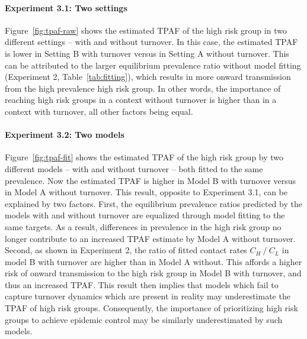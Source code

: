 \paragraph{Experiment 3.1: Two settings}
\label{p:res-tpaf-raw}
Figure~\ref{fig:tpaf-raw} shows the estimated TPAF of the high risk group
in two different settings -- with and without turnover.
In this case, the estimated TPAF is lower
in Setting B with turnover versus
in Setting A without turnover.
This can be attributed to
the larger equilibrium prevalence ratio without model fitting
(Experiment 2, Table~\ref{tab:fitting}),
which results in more onward transmission from the high prevalence high risk group.
In other words, the importance of reaching high risk groups
in a context without turnover is higher than in a context with turnover,
all other factors being equal.
\paragraph{Experiment 3.2: Two models}
\label{p:res-tpaf-fit}
Figure~\ref{fig:tpaf-fit} shows the estimated TPAF of the high risk group
by two different models -- with and without turnover --
both fitted to the same prevalence.
Now the estimated TPAF is higher
in Model B with turnover versus
in Model A without turnover.
This result, opposite to Experiment 3.1, can be explained by two factors.
First, the equilibrium prevalence ratios predicted by the models with and without turnover
are equalized through model fitting to the same targets.
As a result, differences in prevalence in the high risk group
no longer contribute to an increased TPAF estimate by Model A without turnover.
Second, as shown in Experiment 2, 
the ratio of fitted contact rates $C_H~/~C_L$ in model B with turnover
are higher than in Model A without.
This affords a higher risk of onward transmission to the high risk group
in Model B with turnover, and thus an increased TPAF.
This result then implies that
models which fail to capture turnover dynamics which are present in reality
may underestimate the TPAF of high risk groups.
Consequently, the importance of prioritizing high risk groups
to achieve epidemic control may be similarly underestimated by such models.
